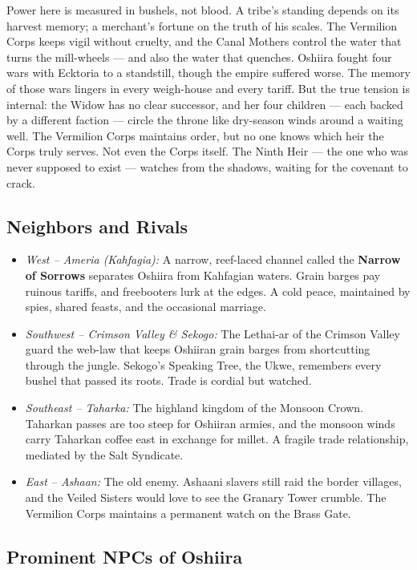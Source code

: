 Power here is measured in bushels, not blood. A tribe's standing depends on its harvest memory; a merchant's fortune on the truth of his scales. The Vermilion Corps keeps vigil without cruelty, and the Canal Mothers control the water that turns the mill-wheels --- and also the water that quenches. Oshiira fought four wars with Ecktoria to a standstill, though the empire suffered worse. The memory of those wars lingers in every weigh-house and every tariff. But the true tension is internal: the Widow has no clear successor, and her four children --- each backed by a different faction --- circle the throne like dry-season winds around a waiting well. The Vermilion Corps maintains order, but no one knows which heir the Corps truly serves. Not even the Corps itself. The Ninth Heir --- the one who was never supposed to exist --- watches from the shadows, waiting for the covenant to crack.

\subsection*{Neighbors and Rivals}
\begin{itemize}
  \item \textit{West -- Ameria (Kahfagia):} A narrow, reef-laced channel called the \textbf{Narrow of Sorrows} separates Oshiira from Kahfagian waters. Grain barges pay ruinous tariffs, and freebooters lurk at the edges. A cold peace, maintained by spies, shared feasts, and the occasional marriage.
  \item \textit{Southwest -- Crimson Valley \& Sekogo:} The Lethai-ar of the Crimson Valley guard the web-law that keeps Oshiiran grain barges from shortcutting through the jungle. Sekogo's Speaking Tree, the Ukwe, remembers every bushel that passed its roots. Trade is cordial but watched.
  \item \textit{Southeast -- Taharka:} The highland kingdom of the Monsoon Crown. Taharkan passes are too steep for Oshiiran armies, and the monsoon winds carry Taharkan coffee east in exchange for millet. A fragile trade relationship, mediated by the Salt Syndicate.
  \item \textit{East -- Ashaan:} The old enemy. Ashaani slavers still raid the border villages, and the Veiled Sisters would love to see the Granary Tower crumble. The Vermilion Corps maintains a permanent watch on the Brass Gate.
\end{itemize}

\subsection*{Prominent NPCs of Oshiira}
\label{sec:oshiira-npcs}

